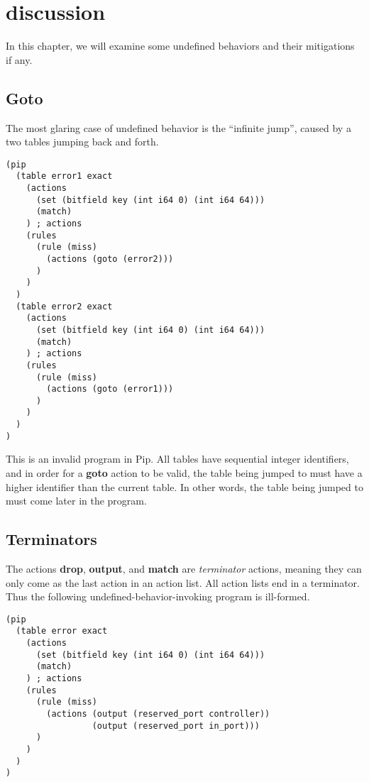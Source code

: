 \section{discussion}
In this chapter, we will examine some undefined behaviors and their mitigations if any.

\subsection{Goto}
The most glaring case of undefined behavior is the ``infinite jump'', caused by a two tables jumping back and forth.
\begin{verbatim}
(pip
  (table error1 exact
    (actions
      (set (bitfield key (int i64 0) (int i64 64)))
      (match)
    ) ; actions
    (rules
      (rule (miss)
        (actions (goto (error2)))
      )
    )
  )
  (table error2 exact
    (actions
      (set (bitfield key (int i64 0) (int i64 64)))
      (match)
    ) ; actions
    (rules
      (rule (miss)
        (actions (goto (error1)))
      )
    )
  )
)
\end{verbatim}
This is an invalid program in Pip. All tables have sequential integer identifiers, and in order for a \textbf{goto} action to be valid, the table being jumped to must have a higher identifier than the current table. In other words, the table being jumped to must come later in the program.

\subsection{Terminators}
The actions \textbf{drop}, \textbf{output}, and \textbf{match} are \textit{terminator} actions, meaning they can only come as the last action in an action list. All action lists end in a terminator. Thus the following undefined-behavior-invoking program is ill-formed.
\begin{verbatim}
(pip
  (table error exact
    (actions
      (set (bitfield key (int i64 0) (int i64 64)))
      (match)
    ) ; actions
    (rules
      (rule (miss)
        (actions (output (reserved_port controller)) 
                 (output (reserved_port in_port)))
      )
    )
  )
)
\end{verbatim}

